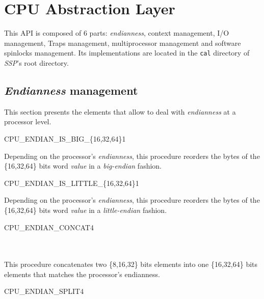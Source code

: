 \chapter {CPU Abstraction Layer}
This API is composed of 6 parts: \textit {endianness}, context management,
I/O management, Traps management, multiprocessor management and software
spinlocks management. Its implementations are located in the \texttt {cal} directory
of \textit {SSP}'s root directory.
\skipon

\skipoff
\section {\textit {Endianness} management}
This section presents the elements that allow to deal with \textit {endianness}
at a processor level.
\skipon

\begin{procedure}{CPU\_ENDIAN\_IS\_BIG\_\{16,32,64\}}{1}
\end{procedure}

Depending on the processor's \textit{endianness}, this procedure
reorders the bytes of the \{16,32,64\} bits word \emph{value}
in a \textit{big-endian} fashion.

\begin{procedure}{CPU\_ENDIAN\_IS\_LITTLE\_\{16,32,64\}}{1}
\end{procedure}

Depending on the processor's \textit{endianness}, this procedure
reorders the bytes of the \{16,32,64\} bits word \emph{value}
in a \textit{little-endian} fashion.

\begin{procedure}{CPU\_ENDIAN\_CONCAT}{4}
	\\
	\\
	\\
\end{procedure}

This procedure concatenates two \{8,16,32\} bits elements into one
\{16,32,64\} bits elements that matches the processor's endianness.

\begin{procedure}{CPU\_ENDIAN\_SPLIT}{4}
	\\
	\\
	\\
\end{procedure}

